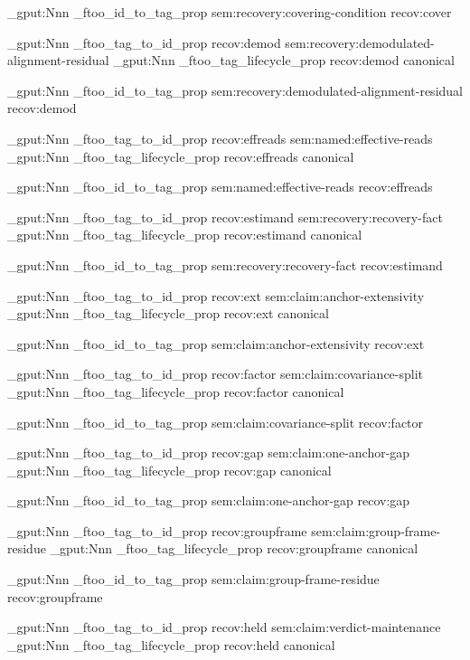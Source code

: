 \prop_gput:Nnn \g_ftoo_id_to_tag_prop { sem:recovery:covering-condition } { recov:cover }


\prop_gput:Nnn \g_ftoo_tag_to_id_prop { recov:demod } { sem:recovery:demodulated-alignment-residual }
\prop_gput:Nnn \g_ftoo_tag_lifecycle_prop { recov:demod } { canonical }

\prop_gput:Nnn \g_ftoo_id_to_tag_prop { sem:recovery:demodulated-alignment-residual } { recov:demod }


\prop_gput:Nnn \g_ftoo_tag_to_id_prop { recov:effreads } { sem:named:effective-reads }
\prop_gput:Nnn \g_ftoo_tag_lifecycle_prop { recov:effreads } { canonical }

\prop_gput:Nnn \g_ftoo_id_to_tag_prop { sem:named:effective-reads } { recov:effreads }


\prop_gput:Nnn \g_ftoo_tag_to_id_prop { recov:estimand } { sem:recovery:recovery-fact }
\prop_gput:Nnn \g_ftoo_tag_lifecycle_prop { recov:estimand } { canonical }

\prop_gput:Nnn \g_ftoo_id_to_tag_prop { sem:recovery:recovery-fact } { recov:estimand }


\prop_gput:Nnn \g_ftoo_tag_to_id_prop { recov:ext } { sem:claim:anchor-extensivity }
\prop_gput:Nnn \g_ftoo_tag_lifecycle_prop { recov:ext } { canonical }

\prop_gput:Nnn \g_ftoo_id_to_tag_prop { sem:claim:anchor-extensivity } { recov:ext }


\prop_gput:Nnn \g_ftoo_tag_to_id_prop { recov:factor } { sem:claim:covariance-split }
\prop_gput:Nnn \g_ftoo_tag_lifecycle_prop { recov:factor } { canonical }

\prop_gput:Nnn \g_ftoo_id_to_tag_prop { sem:claim:covariance-split } { recov:factor }


\prop_gput:Nnn \g_ftoo_tag_to_id_prop { recov:gap } { sem:claim:one-anchor-gap }
\prop_gput:Nnn \g_ftoo_tag_lifecycle_prop { recov:gap } { canonical }

\prop_gput:Nnn \g_ftoo_id_to_tag_prop { sem:claim:one-anchor-gap } { recov:gap }


\prop_gput:Nnn \g_ftoo_tag_to_id_prop { recov:groupframe } { sem:claim:group-frame-residue }
\prop_gput:Nnn \g_ftoo_tag_lifecycle_prop { recov:groupframe } { canonical }

\prop_gput:Nnn \g_ftoo_id_to_tag_prop { sem:claim:group-frame-residue } { recov:groupframe }


\prop_gput:Nnn \g_ftoo_tag_to_id_prop { recov:held } { sem:claim:verdict-maintenance }
\prop_gput:Nnn \g_ftoo_tag_lifecycle_prop { recov:held } { canonical }

